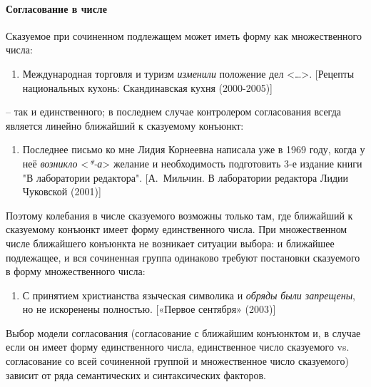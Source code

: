 \paragraph{Согласование в
  числе}\label{ux441ux43eux433ux43bux430ux441ux43eux432ux430ux43dux438ux435-ux432-ux447ux438ux441ux43bux435}

Сказуемое при сочиненном подлежащем может иметь форму как множественного
числа:

\begin{enumerate}
  \def\labelenumi{(\arabic{enumi})}
  \setcounter{enumi}{82}
  \item
        Международная торговля и туризм \textit{изменили} положение дел
        \textless\ldots\textgreater. {[}Рецепты национальных кухонь:
        Скандинавская кухня (2000-2005){]}
\end{enumerate}

-- так и единственного; в последнем случае контролером согласования
всегда является линейно ближайший к сказуемому конъюнкт:

\begin{enumerate}
  \def\labelenumi{(\arabic{enumi})}
  \setcounter{enumi}{83}
  \item
        Последнее письмо ко мне Лидия Корнеевна написала уже в 1969 году,
        когда у неё \textit{возникло} \textless{}\textit{*-а}\textgreater{}
        желание и необходимость подготовить 3-е издание книги "В лаборатории
        редактора". {[}А.~Мильчин. В лаборатории редактора Лидии Чуковской
        (2001){]}
\end{enumerate}

Поэтому колебания в числе сказуемого возможны только там, где ближайший
к сказуемому конъюнкт имеет форму единственного числа. При множественном
числе ближайшего конъюнкта не возникает ситуации выбора: и ближайшее
подлежащее, и вся сочиненная группа одинаково требуют постановки
сказуемого в форму множественного числа:

\begin{enumerate}
  \def\labelenumi{(\arabic{enumi})}
  \setcounter{enumi}{84}
  \item
        С принятием христианства языческая символика и \textit{обряды}
        \textit{были запрещены}, но не искоренены полностью. {[}«Первое
        сентября» (2003){]}
\end{enumerate}

Выбор модели согласования (согласование с ближайшим конъюнктом и, в
случае если он имеет форму единственного числа, единственное число
сказуемого vs. согласование со всей сочиненной группой и множественное
число сказуемого) зависит от ряда семантических и синтаксических
факторов.


